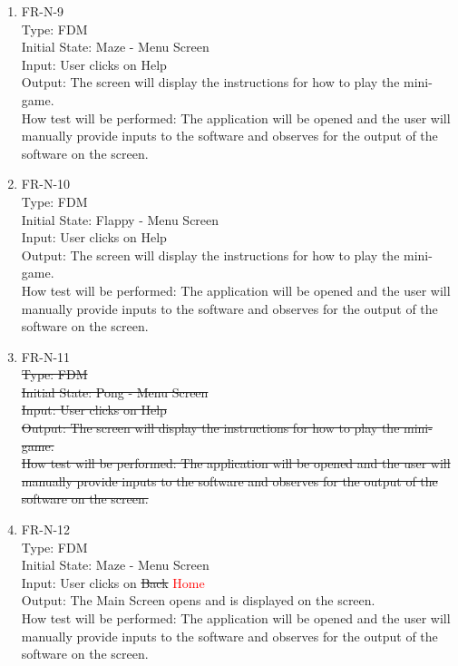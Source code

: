 \documentclass[12pt, titlepage]{article}
\begin{document}
\begin{enumerate}
\item{FR-N-9\\}
Type: FDM\\
Initial State: Maze - Menu Screen\\
Input: User clicks on Help\\
Output: The screen will display the instructions for how to play the mini-game.\\
How test will be performed: The application will be opened and the user will manually provide inputs to the software and observes for the output of the software on the screen.\\

\item{FR-N-10\\}
Type: FDM\\
Initial State: Flappy - Menu Screen\\
Input: User clicks on Help\\
Output: The screen will display the instructions for how to play the mini-game.\\
How test will be performed: The application will be opened and the user will manually provide inputs to the software and observes for the output of the software on the screen.\\

\item{FR-N-11\\}
\sout{Type: FDM\\
Initial State: Pong - Menu Screen\\
Input: User clicks on Help\\
Output: The screen will display the instructions for how to play the mini-game.\\
How test will be performed: The application will be opened and the user will manually provide inputs to the software and observes for the output of the software on the screen.\\}

\item{FR-N-12\\}
Type: FDM\\
Initial State: Maze - Menu Screen\\
Input: User clicks on \sout{Back} \textcolor{red}{Home}\\
Output: The Main Screen opens and is displayed on the screen.\\
How test will be performed: The application will be opened and the user will manually provide inputs to the software and observes for the output of the software on the screen.\\


\end{enumerate}
\end{document}
